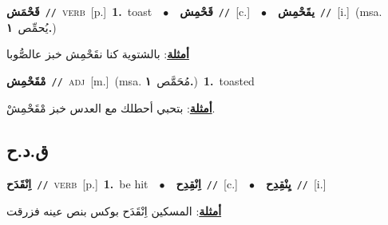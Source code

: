 \documentclass[10pt,a4paper,twoside]{article} %
\begin{document}
\begin{multicols}{2}
{\setlength\topsep{0pt}\textbf{\foreignlanguage{arabic}{قَحْمَش}}\ {\color{gray}\texttt{//}\color{black}}\ \textsc{verb}\ [p.]\ \textbf{1.}~toast\ \ $\bullet$\ \ \setlength\topsep{0pt}\textbf{\foreignlanguage{arabic}{قَحْمِش}}\ {\color{gray}\texttt{//}\color{black}}\ [c.]\ \ $\bullet$\ \ \setlength\topsep{0pt}\textbf{\foreignlanguage{arabic}{يقَحْمِش}}\ {\color{gray}\texttt{//}\color{black}}\ [i.]\ \color{gray}(msa. \foreignlanguage{arabic}{يُحمِّص}~\foreignlanguage{arabic}{\textbf{١.}})\color{black}\  \begin{flushright}\color{gray}\foreignlanguage{arabic}{\textbf{\underline{\foreignlanguage{arabic}{أمثلة}}}: بالشتوية كنا نقَحْمِش خبز عالصُّوبا}\end{flushright}\color{black}} \vspace{2mm}

{\setlength\topsep{0pt}\textbf{\foreignlanguage{arabic}{مْقَحْمِش}}\ {\color{gray}\texttt{//}\color{black}}\ \textsc{adj}\ [m.]\ \color{gray}(msa. \foreignlanguage{arabic}{مُحَمَّص}~\foreignlanguage{arabic}{\textbf{١.}})\color{black}\ \textbf{1.}~toasted\  \begin{flushright}\color{gray}\foreignlanguage{arabic}{\textbf{\underline{\foreignlanguage{arabic}{أمثلة}}}: بتحبي أحطلك مع العدس خبز مْقَحْمِشْ.}\end{flushright}\color{black}} \vspace{2mm}

\vspace{-3mm}
\subsection*{\color{blue}\foreignlanguage{arabic}{ق.د.ح}\color{blue}{}} 

{\setlength\topsep{0pt}\textbf{\foreignlanguage{arabic}{اِنْقَدَح}}\ {\color{gray}\texttt{//}\color{black}}\ \textsc{verb}\ [p.]\ \textbf{1.}~be hit\ \ $\bullet$\ \ \setlength\topsep{0pt}\textbf{\foreignlanguage{arabic}{اِنْقِدِح}}\ {\color{gray}\texttt{//}\color{black}}\ [c.]\ \ $\bullet$\ \ \setlength\topsep{0pt}\textbf{\foreignlanguage{arabic}{يِنْقِدِح}}\ {\color{gray}\texttt{//}\color{black}}\ [i.]\  \begin{flushright}\color{gray}\foreignlanguage{arabic}{\textbf{\underline{\foreignlanguage{arabic}{أمثلة}}}: المسكين اِنْقَدَح بوكس بنص عينه فزرقت}\end{flushright}\color{black}} \vspace{2mm}


\end{multicols}
\end{document}
